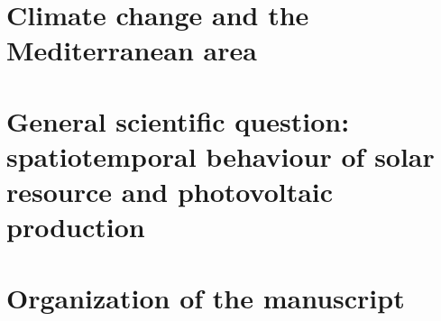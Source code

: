 \section{Climate change and the Mediterranean area}
\section{General scientific question: spatiotemporal behaviour of solar resource and photovoltaic production}
\section{Organization of the manuscript}


